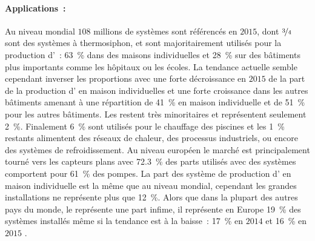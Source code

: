 \paragraph{Applications~:} %
\label{par:applications}
Au niveau mondial $108$ millions de systèmes sont référencés en $2015$, dont $\nicefrac{3}{4}$
sont des systèmes à thermosiphon, et sont majoritairement utilisés pour la production
d’~: \SI{63}{\percent} dans des maisons individuelles et \SI{28}{\percent} sur des bâtiments plus importants comme
les hôpitaux ou les écoles. La tendance actuelle semble cependant inverser les proportions
avec une forte décroissance en $2015$ de la part de la production d’ en maison individuelles
et une forte croissance dans les autres bâtiments amenant à une répartition de \SI{41}{\percent} en maison
individuelle et de \SI{51}{\percent} pour les autres bâtiments.
Les  restent très minoritaires et représentent seulement \SI{2}{\percent}.
Finalement \SI{6}{\percent} sont utilisés pour le chauffage des piscines et les \SI{1}{\percent}
restants alimentent des réseaux de chaleur, des processus industriels, ou encore des systèmes de
refroidissement.
Au niveau européen le marché est principalement tourné vers les capteurs plans avec \SI{72.3}{\percent}
des parts utilisés avec des systèmes comportent pour \SI{61}{\percent} des pompes.
La part des système de production d’ en maison individuelle est la même que au niveau mondial,
cependant les grandes installations ne représente plus que \SI{12}{\percent}. Alors que
dans la plupart des autres pays du monde, le  représente une part infime, il
représente en Europe \SI{19}{\percent} des systèmes installés même si la tendance est à
la baisse~: \SI{17}{\percent} en $2014$ \parencite{Mauthner2016} et \SI{16}{\percent} en
$2015$ \parencite{Weiss2017}.


